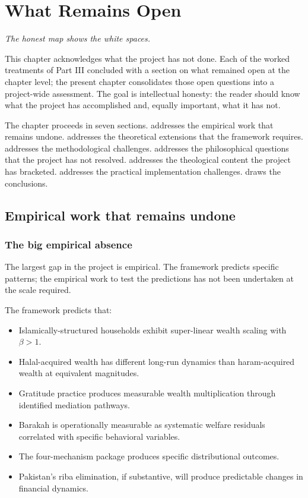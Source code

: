 \chapter{What Remains Open}
\label{ch:open}

\epigraph{\itshape The honest map shows the white spaces.}{}

\noindent
This chapter acknowledges what the project has not done. Each of
the worked treatments of Part III concluded with a section on
what remained open at the chapter level; the present chapter
consolidates those open questions into a project-wide assessment.
The goal is intellectual honesty: the reader should know what the
project has accomplished and, equally important, what it has not.

The chapter proceeds in seven sections. 
addresses the empirical work that remains undone.
 addresses the theoretical extensions
that the framework requires. 
addresses the methodological challenges. 
addresses the philosophical questions that the project has not
resolved.  addresses the theological
content the project has bracketed. 
addresses the practical implementation challenges.
 draws the conclusions.

\section{Empirical work that remains undone}
\label{sec:open-empirical}

\subsection{The big empirical absence}

The largest gap in the project is empirical. The framework
predicts specific patterns; the empirical work to test the
predictions has not been undertaken at the scale required.

The framework predicts that:
\begin{itemize}[leftmargin=2em]
    \item Islamically-structured households exhibit super-linear
    wealth scaling with $\beta > 1$.
    \item Halal-acquired wealth has different long-run dynamics
    than haram-acquired wealth at equivalent magnitudes.
    \item Gratitude practice produces measurable wealth
    multiplication through identified mediation pathways.
    \item Barakah is operationally measurable as systematic
    welfare residuals correlated with specific behavioral
    variables.
    \item The four-mechanism package produces specific
    distributional outcomes.
    \item Pakistan's riba elimination, if substantive, will
    produce predictable changes in financial dynamics.
\end{itemize}

